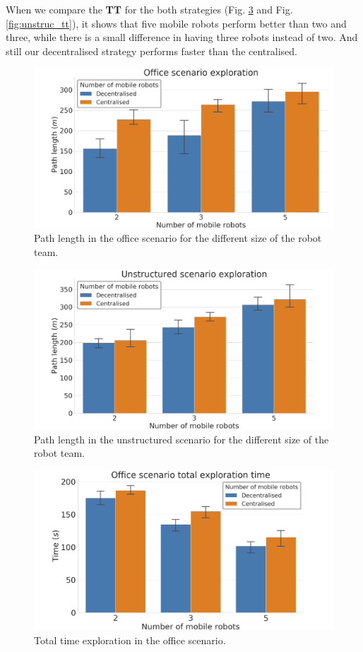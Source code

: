 \documentclass[letterpaper, 10 pt, conference]{ieeeconf}  %
\begin{document}
When we compare the \textbf{TT} for the both strategies (Fig. \ref{fig:office_tt} and Fig. \ref{fig:unstruc_tt}), it shows that five mobile robots perform better than two and three, while there is a small difference in having three robots instead of two. And still our decentralised strategy performs faster than the centralised. 
\begin{figure}[t]
	\centering\includegraphics[width=0.9\columnwidth]{office_path.png}
	\caption{Path length in the office scenario for the different size of the robot team.}
	\label{fig:office_path}
\end{figure}

\begin{figure}[t]
	\centering\includegraphics[width=0.9\columnwidth]{unstructured_path.png}
	\caption{Path length in the unstructured scenario for the different size of the robot team.}
	\label{fig:unstruc_path}
\end{figure}

\begin{figure}[t]
	\centering\includegraphics[width=0.9\columnwidth]{office_tt.png}
	\caption{Total time exploration in the office scenario.}
	\label{fig:office_tt}
\end{figure}
\end{document}
